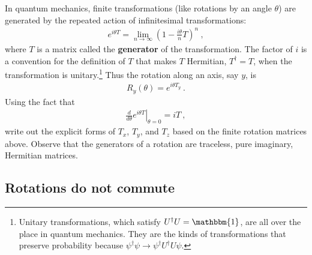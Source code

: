\documentclass[12pt]{article}
\numberwithin{equation}{section}    %
\begin{document}
In quantum mechanics, finite transformations (like rotations by an angle $\theta$) are generated by the repeated action of infinitesimal transformations:
\begin{align}
	e^{i\theta T} = \lim_{n\to\infty} \left(1- \frac{i\theta}{n} T\right)^n \ ,
\end{align}
where $T$ is a matrix called the \textbf{generator} of the transformation. The factor of $i$ is a convention for the definition of $T$ that makes $T$ Hermitian, $T^\dag = T$, when the transformation is unitary.\footnote{Unitary transformations, which satisfy $U^\dag U = \mathbbm{1}$, are all over the place in quantum mechanics. They are the kinds of transformations that preserve probability because $\psi^\dag \psi \to \psi^\dag U^\dag U \psi$.} Thus the rotation along an axis, say $y$, is
\begin{align}
	R_y(\theta) = e^{i\theta T_y} \ .
\end{align}
Using the fact that 
\begin{align}
	\left.\frac{d}{d\theta} e^{i\theta T}\right|_{\theta=0} = i T \ ,
	\label{eq:tangent:plane}
\end{align}
write out the explicit forms of $T_x$, $T_y$, and $T_z$ based on the finite rotation matrices above. Observe that the generators of a rotation are traceless, pure imaginary, Hermitian matrices. 

\subsection{Rotations do not commute}
\end{document}
